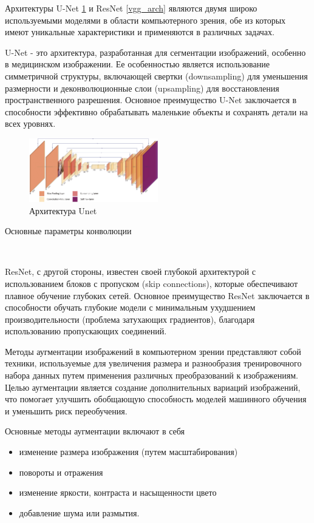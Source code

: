 Архитектуры U-Net \ref{unet_arch}  и ResNet \ref{vgg_arch} являются двумя широко используемыми моделями в области компьютерного зрения, обе из которых имеют уникальные характеристики и применяются в различных задачах.

U-Net - это архитектура, разработанная для сегментации изображений, особенно в медицинском изображении. Ее особенностью является использование симметричной структуры, включающей свертки (downsampling) для уменьшения размерности и деконволюционные слои (upsampling) для восстановления пространственного разрешения. Основное преимущество U-Net заключается в способности эффективно обрабатывать маленькие объекты и сохранять детали на всех уровнях.

\begin{figure}[h]
    \centering
    \includegraphics[width=0.5\textwidth]{assets/ml/cv/unet.png}
    \caption{Архитектура Unet \cite{ronneberger2015u}}
    \label{unet_arch}
\end{figure}

Основные параметры конволюции \begin{itemize}
    \

\end{itemize}


ResNet, с другой стороны, известен своей глубокой архитектурой с использованием блоков с пропуском (skip connections), которые обеспечивают плавное обучение глубоких сетей. Основное преимущество ResNet заключается в способности обучать глубокие модели с минимальным ухудшением производительности (проблема затухающих градиентов), благодаря использованию пропускающих соединений.



Методы аугментации изображений в компьютерном зрении представляют собой техники, используемые для увеличения размера и разнообразия тренировочного набора данных путем применения различных преобразований к изображениям. 
Целью аугментации является создание дополнительных вариаций изображений, что помогает улучшить обобщающую способность моделей машинного обучения и уменьшить риск переобучения.

Основные методы аугментации включают в себя
\begin{itemize}
    \item изменение размера изображения (путем масштабирования)
    \item  повороты и отражения 
    \item  изменение яркости, контраста и насыщенности цвето
    \item добавление шума или размытия.
\end{itemize}    
    

